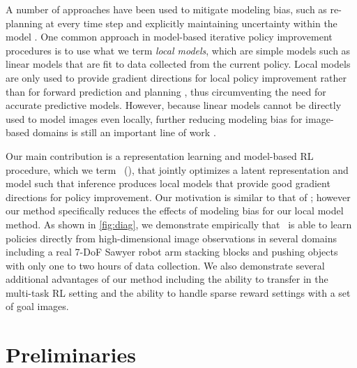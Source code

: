 A number of approaches have been used to mitigate modeling bias, such as re-planning at every time step \citep{mpc,nn-dyn} and explicitly maintaining uncertainty within the model \citep{pilco,pets}. One common approach in model-based iterative policy improvement procedures is to use what we term \emph{local models}, which are simple models such as linear models that are fit to data collected from the current policy. Local models are only used to provide gradient directions for local policy improvement rather than for forward prediction and planning \citep{ilqg,mfcgps}, thus circumventing the need for accurate predictive models. However, because linear models cannot be directly used to model images even locally, further reducing modeling bias for image-based domains is still an important line of work \citep{dvf,e2c}.

Our main contribution is a representation learning and model-based RL procedure, which we term \methodname\ (\metabbr), that jointly optimizes a latent representation and model such that inference produces local models that provide good gradient directions for policy improvement. Our motivation is similar to that of \citet{e2c,spatial-ae}; however our method specifically reduces the effects of modeling bias for our local model method. As shown in \autoref{fig:diag}, we demonstrate empirically that \metabbr\ is able to learn policies directly from high-dimensional image observations in several domains including a real 7-DoF Sawyer robot arm stacking blocks and pushing objects with only one to two hours of data collection. We also demonstrate several additional advantages of our method including the ability to transfer in the multi-task RL setting and the ability to handle sparse reward settings with a set of goal images.


\section{Preliminaries}
\label{sec:prelim}

